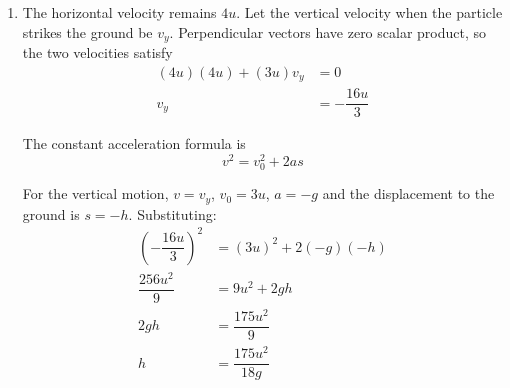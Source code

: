 \documentclass[leqno]{article}
\begin{document}
\begin{enumerate}[
  label=\textbf{\arabic*.},
  leftmargin=*,
  topsep=0pt,
  partopsep=0pt,
  parsep=0pt
]
\begin{djsSolution}
\begin{enumerate}[label=\textbf{(\alph*)}, start=1]
Since the squared term is non-negative and \(g>0\), the maximum occurs at \(x=\frac{12u^2}{g}>0\). The maximum height above the ground is therefore
\[
h+\dfrac{9u^2}{2g}
\]

\item The horizontal velocity remains \(4u\). Let the vertical velocity when the particle strikes the ground be \(v_y\). Perpendicular vectors have zero scalar product, so the two velocities satisfy
\begin{align*}
(4u)(4u)+(3u)v_y&=0\\
v_y&=-\dfrac{16u}{3}
\end{align*}

The constant acceleration formula is
\[
v^2=v_0^2+2as
\]

For the vertical motion, \(v=v_y\), \(v_0=3u\), \(a=-g\) and the displacement to the ground is \(s=-h\). Substituting:
\begin{align*}
\left(-\dfrac{16u}{3}\right)^2&=(3u)^2+2(-g)(-h)\\
\dfrac{256u^2}{9}&=9u^2+2gh\\
2gh&=\dfrac{175u^2}{9}\\
h&=\dfrac{175u^2}{18g}
\end{align*}

\end{enumerate}
\end{djsSolution}

\newpage

\questionitem


\end{enumerate}
\end{document}
